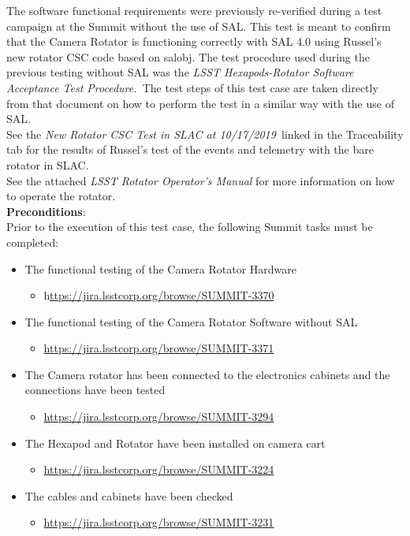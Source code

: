 \documentclass[SE,lsstdraft,STR,toc]{lsstdoc}
\providecommand{\tightlist}{
  \setlength{\itemsep}{0pt}\setlength{\parskip}{0pt}}
\begin{document}
The software functional requirements were previously re-verified during
a test campaign at the Summit without the use of SAL. This test is meant
to confirm that the Camera Rotator is functioning correctly with SAL 4.0
using Russel's new rotator CSC code based on salobj. The test procedure
used during the previous testing without SAL was the \emph{LSST
Hexapods-Rotator Software Acceptance Test Procedure.~}The test steps of
this test case are taken directly from that document on how to perform
the test in a similar way with the use of SAL.\\[2\baselineskip]See the
\emph{New Rotator CSC Test in SLAC at 10/17/2019~}linked in the
Traceability tab for the results of Russel's test of the events and
telemetry with the bare rotator in SLAC.\\[2\baselineskip]See the
attached \emph{LSST Rotator Operator's Manual} for more information on
how to operate the rotator.\\[2\baselineskip]


\textbf{ Preconditions}:\\
 Prior to the execution of this test case, the following Summit tasks
must be completed:

\begin{itemize}
\tightlist
\item
  The functional testing of the Camera Rotator Hardware~

  \begin{itemize}
  \tightlist
  \item
    h\href{https://jira.lsstcorp.org/browse/SUMMIT-3370}{ttps://jira.lsstcorp.org/browse/SUMMIT-3370}
  \end{itemize}
\item
  The functional testing of the Camera Rotator Software without SAL

  \begin{itemize}
  \tightlist
  \item
    \url{https://jira.lsstcorp.org/browse/SUMMIT-3371}
  \end{itemize}
\item
  The Camera rotator has been connected to the electronics cabinets and
  the connections have been tested

  \begin{itemize}
  \tightlist
  \item
    \url{https://jira.lsstcorp.org/browse/SUMMIT-3294}
  \end{itemize}
\item
  The Hexapod and Rotator have been installed on camera cart

  \begin{itemize}
  \tightlist
  \item
    \url{https://jira.lsstcorp.org/browse/SUMMIT-3224}
  \end{itemize}
\item
  The cables and cabinets have been checked

  \begin{itemize}
  \tightlist
  \item
    \url{https://jira.lsstcorp.org/browse/SUMMIT-3231}
  \end{itemize}
\end{itemize}
\end{document}
